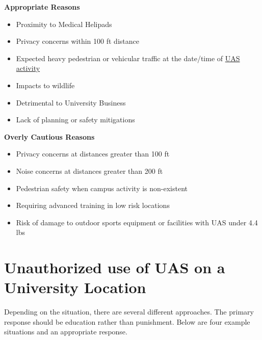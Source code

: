 \documentclass[
]{book}
\providecommand{\tightlist}{%
  \setlength{\itemsep}{0pt}\setlength{\parskip}{0pt}}
\begin{document}
\textbf{Appropriate Reasons}

\begin{itemize}
\tightlist
\item
  Proximity to Medical Helipads
\item
  Privacy concerns within 100 ft distance
\item
  Expected heavy pedestrian or vehicular traffic at the date/time of \protect\hyperlink{UASactivity}{UAS activity}
\item
  Impacts to wildlife
\item
  Detrimental to University Business
\item
  Lack of planning or safety mitigations
\end{itemize}

\textbf{Overly Cautious Reasons}

\begin{itemize}
\tightlist
\item
  Privacy concerns at distances greater than 100 ft
\item
  Noise concerns at distances greater than 200 ft
\item
  Pedestrian safety when campus activity is non-existent
\item
  Requiring advanced training in low risk locations
\item
  Risk of damage to outdoor sports equipment or facilities with UAS under 4.4 lbs
\end{itemize}

\hypertarget{unauthorized-use-of-uas-on-a-university-location}{%
\section{Unauthorized use of UAS on a University Location}\label{unauthorized-use-of-uas-on-a-university-location}}

Depending on the situation, there are several different approaches. The primary response should be education rather than punishment. Below are four example situations and an appropriate response.
\end{document}
